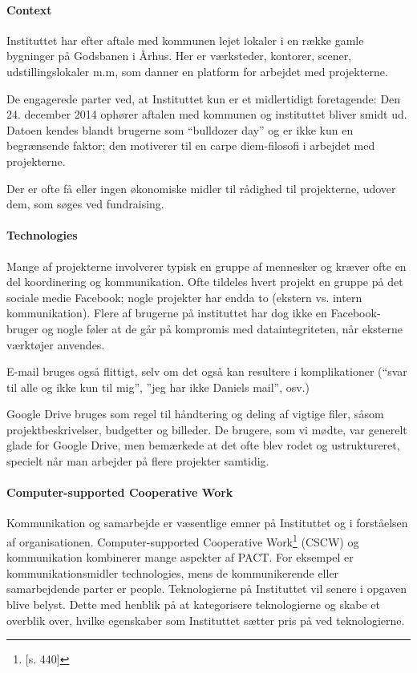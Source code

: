 \paragraph{Context}
Instituttet har efter aftale med kommunen lejet lokaler i en række gamle bygninger på Godsbanen i Århus. Her er værksteder, kontorer, scener, udstillingslokaler m.m, som danner en platform for arbejdet med projekterne.

De engagerede parter ved, at Instituttet kun er et midlertidigt foretagende: Den
24. december 2014 ophører aftalen med kommunen og instituttet bliver smidt ud. Datoen kendes blandt brugerne som “bulldozer day” og er ikke kun en begrænsende faktor; den motiverer til en carpe diem-filosofi i arbejdet med projekterne.

Der er ofte få eller ingen økonomiske midler til rådighed til projekterne, udover dem, som søges ved fundraising.

\paragraph{Technologies}
Mange af projekterne involverer typisk en gruppe af mennesker og kræver ofte en del koordinering og kommunikation. Ofte tildeles hvert projekt en gruppe på det sociale medie Facebook; nogle projekter har endda to (ekstern vs. intern kommunikation). Flere af brugerne på instituttet har dog ikke en Facebook-bruger og nogle føler at de går på kompromis med dataintegriteten, når eksterne værktøjer anvendes.

E-mail bruges også flittigt, selv om det også kan resultere i komplikationer (“svar til alle og ikke kun til mig”, ”jeg har ikke Daniels mail”, osv.)

Google Drive bruges som regel til håndtering og deling af vigtige filer, såsom projektbeskrivelser, budgetter og billeder. De brugere, som vi mødte, var generelt glade for Google Drive, men bemærkede at det ofte blev rodet og ustruktureret, specielt når man arbejder på flere projekter samtidig.

\paragraph{Computer-supported Cooperative Work}
Kommunikation og samarbejde er væsentlige emner på Instituttet og i forståelsen af organisationen. Computer-supported Cooperative Work\footnote{\citep{Benyon}[s. 440]} (CSCW) og kommunikation kombinerer mange aspekter af PACT. For eksempel er kommunikationsmidler technologies, mens de kommunikerende eller samarbejdende parter er people. Teknologierne på Instituttet vil senere i opgaven blive belyst. Dette med henblik på at kategorisere teknologierne og skabe et overblik over, hvilke egenskaber som Instituttet sætter pris på ved teknologierne.
 
